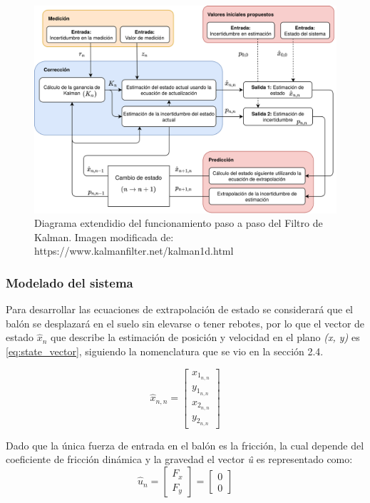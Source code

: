 \begin{figure}
\centering
\includegraphics[scale=0.055]{images/kalman_extended_diagram.png}
\caption{Diagrama extendidio del funcionamiento paso a paso del Filtro de Kalman. Imagen modificada de: https://www.kalmanfilter.net/kalman1d.html}
\label{fig:kalman_extended_diagram}
\end{figure}

		\subsubsection*{Modelado del sistema}
Para desarrollar las ecuaciones de extrapolación de estado se considerará que el balón se desplazará en el suelo sin elevarse o tener rebotes, por lo que el vector de estado $\hat{x}_n$ que describe la estimación de posición y velocidad en el plano \textit{(x, y)} es \ref{eq:state_vector}, siguiendo la nomenclatura que se vio en la sección 2.4.

\begin{equation}
\hat{x}_{n,n} = \begin{bmatrix}
x_{1_{n,n}}\\ 
y_{1_{n,n}}\\ 
x_{2_{n,n}}\\ 
y_{2_{n,n}}
\end{bmatrix}
\label{eq:state_vector}
\end{equation}

Dado que la única fuerza de entrada en el balón es la fricción, la cual depende del coeficiente de fricción dinámica y la gravedad el vector \textit{û} es representado como:
\begin{equation}
\hat{u}_n = \begin{bmatrix}
F_x\\
F_y
\end{bmatrix} = 
\begin{bmatrix}
0\\
0
\end{bmatrix}
\label{eq:input_signal}
\end{equation}


